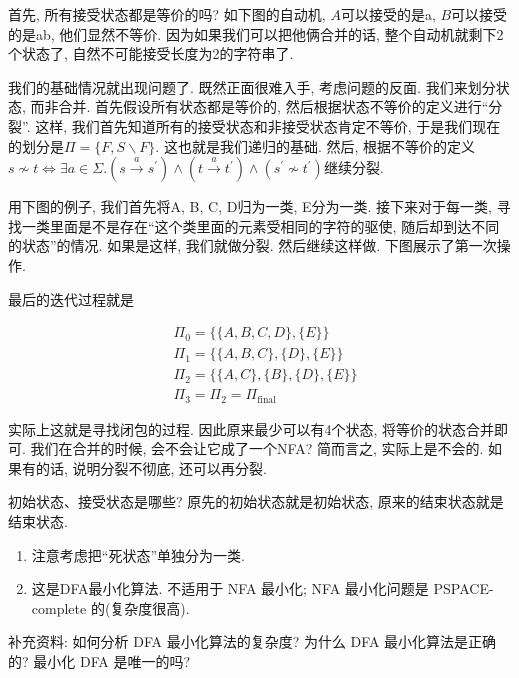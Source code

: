 \documentclass{ctexart}
\begin{document}
首先, 所有接受状态都是等价的吗? 如下图的自动机, $A$可以接受的是a, $B$可以接受的是ab, 他们显然不等价. 因为如果我们可以把他俩合并的话, 整个自动机就剩下2个状态了, 自然不可能接受长度为2的字符串了. 


我们的基础情况就出现问题了. 既然正面很难入手, 考虑问题的反面. 我们来划分状态, 而非合并. 首先假设所有状态都是等价的, 然后根据状态不等价的定义进行``分裂''. 这样, 我们首先知道所有的接受状态和非接受状态肯定不等价, 于是我们现在的划分是$\Pi=\{F, S \backslash F\}$. 这也就是我们递归的基础. 然后, 根据不等价的定义$s \nsim t \Longleftrightarrow \exists a \in \Sigma .\left(s \xrightarrow{a} s^{\prime}\right) \wedge\left(t \xrightarrow{a} t^{\prime}\right) \wedge\left(s^{\prime} \nsim t^{\prime}\right)$继续分裂. 

用下图的例子, 我们首先将A, B, C, D归为一类, E分为一类. 接下来对于每一类, 寻找一类里面是不是存在``这个类里面的元素受相同的字符的驱使, 随后却到达不同的状态''的情况. 如果是这样, 我们就做分裂. 然后继续这样做. 下图展示了第一次操作. 


最后的迭代过程就是

$$
\begin{aligned}
& \Pi_0=\{\{A, B, C, D\},\{E\}\} \\
& \Pi_1=\{\{A, B, C\},\{D\},\{E\}\} \\
& \Pi_2=\{\{A, C\},\{B\},\{D\},\{E\}\} \\
& \Pi_3=\Pi_2=\Pi_{\text {final }}
\end{aligned}
$$

实际上这就是寻找闭包的过程. 因此原来最少可以有4个状态, 将等价的状态合并即可. 我们在合并的时候, 会不会让它成了一个NFA? 简而言之, 实际上是不会的. 如果有的话, 说明分裂不彻底, 还可以再分裂. 

初始状态、接受状态是哪些? 原先的初始状态就是初始状态, 原来的结束状态就是结束状态.

\begin{remark}
    \begin{enumerate}
        \item 注意考虑把``死状态''单独分为一类. 
        \item 这是DFA最小化算法. 不适用于 NFA 最小化; NFA 最小化问题是 PSPACE-complete 的(复杂度很高).
    \end{enumerate}
\end{remark}

补充资料: 如何分析 DFA 最小化算法的复杂度? 为什么 DFA 最小化算法是正确的? 最小化 DFA 是唯一的吗?
\end{document}
